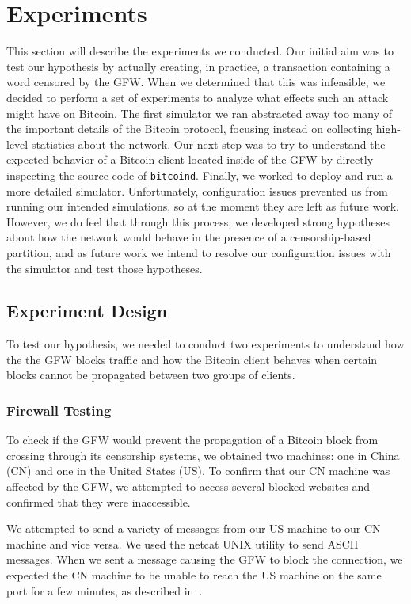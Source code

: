 \section{Experiments}
This section will describe the experiments we conducted. Our initial aim was to test our hypothesis by actually creating, in practice, a transaction containing a word censored by the GFW. When we determined that this was infeasible, we decided to perform a set of experiments to analyze what effects such an attack might have on Bitcoin. The first simulator we ran abstracted away too many of the important details of the Bitcoin protocol, focusing instead on collecting high-level statistics about the network. Our next step was to try to understand the expected behavior of a Bitcoin client located inside of the GFW by directly inspecting the source code of \texttt{bitcoind}. Finally, we worked to deploy and run a more detailed simulator. Unfortunately, configuration issues prevented us from running our intended simulations, so at the moment they are left as future work. However, we do feel that through this process, we developed strong hypotheses about how the network would behave in the presence of a censorship-based partition, and as future work we intend to resolve our configuration issues with the simulator and test those hypotheses.

\subsection{Experiment Design}
To test our hypothesis, we needed to conduct two experiments to understand how the the GFW blocks traffic and how the Bitcoin client behaves when certain blocks cannot be propagated between two groups of clients.

\subsubsection{Firewall Testing}
To check if the GFW would prevent the propagation of a Bitcoin block from crossing through its censorship systems, we obtained two machines: one in China (CN) and one in the United States (US). To confirm that our CN machine was affected by the GFW, we attempted to access several blocked websites and confirmed that they were inaccessible.

We attempted to send a variety of messages from our US machine to our CN machine and vice versa. We used the netcat UNIX utility to send ASCII messages. When we sent a message causing the GFW to block the connection, we expected the CN machine to be unable to reach the US machine on the same port for a few minutes, as described in~\cite{ignoring}.

